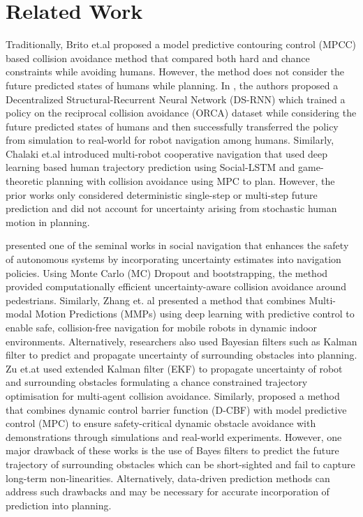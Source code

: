 \section{Related Work}
Traditionally, Brito et.al \cite{Brito} proposed a model predictive contouring control (MPCC) based  collision avoidance method that compared both hard and chance constraints while avoiding humans. However, the method does not consider the future predicted states of humans while planning. In \cite{Liu},  the authors proposed a Decentralized Structural-Recurrent Neural Network (DS-RNN) which trained a policy on the reciprocal collision avoidance (ORCA) dataset while considering the future predicted states of humans  and then successfully transferred the policy from simulation to real-world for robot navigation among humans.  Similarly, Chalaki et.al \cite{Le_multi} introduced multi-robot cooperative navigation that used deep learning based human trajectory prediction using Social-LSTM and game-theoretic planning with collision avoidance  using MPC to plan. However, the prior works only considered deterministic single-step or multi-step future prediction and did not account for  uncertainty arising from stochastic human motion in planning.


 \cite{Safe_RL} presented one of the seminal works in social navigation   that enhances the safety of autonomous systems by incorporating uncertainty estimates into navigation policies. Using Monte Carlo (MC) Dropout \cite{dropout} and bootstrapping, the method provided computationally efficient uncertainty-aware collision avoidance around pedestrians.
Similarly, Zhang et. al \cite{zhang_MMP} presented a method that combines Multi-modal Motion Predictions (MMPs) using deep learning with predictive control to enable safe, collision-free navigation for mobile robots in dynamic indoor environments. Alternatively, researchers also used   Bayesian filters such as Kalman filter to predict and propagate uncertainty of surrounding obstacles into planning.  Zu et.at \cite{Hai_Zu} used extended Kalman filter (EKF) to propagate uncertainty of robot and surrounding obstacles formulating  a chance constrained trajectory optimisation for multi-agent collision avoidance. Similarly, 
\cite{Jian}  proposed a method that combines dynamic control barrier function (D-CBF)  with model predictive control (MPC) to ensure safety-critical dynamic obstacle avoidance with demonstrations through simulations and real-world experiments. However, one major drawback of these works is the use of Bayes filters to predict the future trajectory of surrounding obstacles which can be short-sighted and fail to capture long-term non-linearities.  Alternatively,   data-driven prediction methods can address such drawbacks and may be necessary for accurate incorporation of prediction into planning. 

